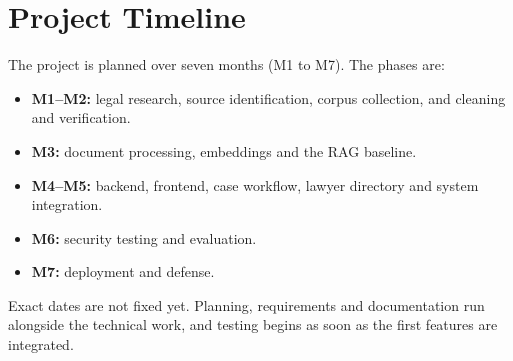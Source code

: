 \documentclass[12pt,a4paper]{report}
\begin{document}
\section{Project Timeline}
The project is planned over seven months (M1 to M7). The phases are:
\begin{itemize}
  \item \textbf{M1--M2:} legal research, source identification, corpus collection, and cleaning and verification.
  \item \textbf{M3:} document processing, embeddings and the RAG baseline.
  \item \textbf{M4--M5:} backend, frontend, case workflow, lawyer directory and system integration.
  \item \textbf{M6:} security testing and evaluation.
  \item \textbf{M7:} deployment and defense.
\end{itemize}
Exact dates are not fixed yet. Planning, requirements and documentation run alongside the technical work, and testing begins as soon as the first features are integrated.
\end{document}

